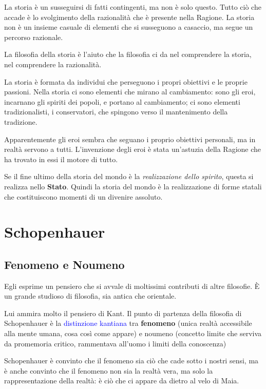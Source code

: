 \documentclass[a4paper, twoside, titlepage]{book}
\renewcommand{\emph}[1]{\textcolor{blue}{#1}}
\begin{document}
La storia è un susseguirsi di fatti contingenti, ma non è solo questo. Tutto ciò che accade è lo svolgimento della razionalità che è presente nella Ragione.
La storia non è un insieme casuale di elementi che si susseguono a casaccio, ma segue un percorso razionale.

La filosofia della storia è l’aiuto che la filosofia ci da nel comprendere la storia, nel comprendere la razionalità.

La storia è formata da individui che perseguono i propri obiettivi e le proprie passioni.
Nella storia ci sono elementi che mirano al cambiamento: sono gli eroi, incarnano gli spiriti dei popoli, e portano al cambiamento; ci sono elementi tradizionalisti, i conservatori, che spingono verso il mantenimento della tradizione.

Apparentemente gli eroi sembra che seguano i proprio obiettivi personali, ma in realtà servono a tutti. L’invenzione degli eroi è stata un’astuzia della Ragione che ha trovato in essi il motore di tutto.

Se il fine ultimo della storia del mondo è la \textit{realizzazione dello spirito}, questa si realizza nello \textbf{Stato}. Quindi la storia del mondo è la realizzazione di forme statali che costituiscono momenti di un divenire assoluto.


\part{Schopenhauer}

\chapter{Fenomeno e Noumeno}

Egli esprime un pensiero che si avvale di moltissimi contributi di altre filosofie. È un grande studioso di filosofia, sia antica che orientale.

Lui ammira molto il pensiero di Kant. Il punto di partenza della filosofia di Schopenhauer è la \emph{distinzione kantiana} tra \textbf{fenomeno} (unica realtà accessibile alla mente umana, cosa così come appare) e noumeno (concetto limite che serviva da promemoria critico, rammentava all’uomo i limiti della conoscenza)

Schopenhauer è convinto che il fenomeno sia ciò che cade sotto i nostri sensi, ma è anche convinto che il fenomeno non sia la realtà vera, ma solo la rappresentazione della realtà: è ciò che ci appare da dietro al velo di Maia.
\end{document}
